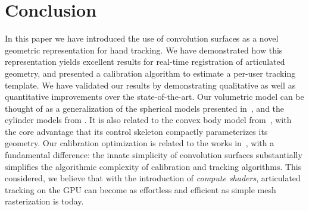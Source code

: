 
\section{Conclusion}
\label{sec:conclusion}

In this paper we have introduced the use of convolution surfaces as a novel geometric representation for hand tracking. We have demonstrated how this representation yields excellent results for real-time registration of articulated geometry, and presented a calibration algorithm to estimate a per-user tracking template. We have validated our results by demonstrating qualitative as well as quantitative improvements over the state-of-the-art. Our volumetric model can be thought of as a generalization of the spherical models presented in~\cite{sridhar2015fast,qian2014realtime}, and the cylinder models from \cite{oiko2011hand,tagliasacchi2015robust}. It is also related to the convex body model from~\cite{melax2013dynamics}, with the core advantage that its control skeleton compactly parameterizes its geometry. Our calibration optimization is related to the works in~\cite{taylor2014user,khamis15learning,tan2016fitsglove}, with a fundamental difference: the innate simplicity of convolution surfaces substantially simplifies the algorithmic complexity of calibration and tracking algorithms. This considered, we believe that with the introduction of \emph{compute shaders}, articulated tracking on the GPU can become as effortless and efficient as simple mesh rasterization is today.

